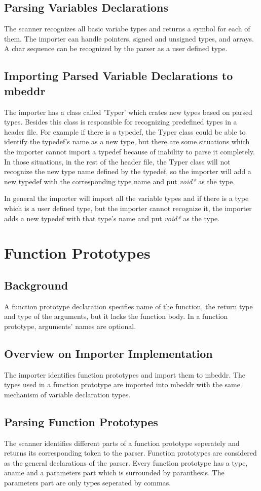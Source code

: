\documentclass[titlepage]{article}
\begin{document}
\subsection{Parsing Variables Declarations}
The scanner recognizes all basic variabe types and returns a symbol for each of them. The importer can handle pointers, signed and unsigned types, and arrays. A char sequence can be recognized by the parser as a user defined type.
\subsection{Importing Parsed Variable Declarations to mbeddr}
The importer has a class called 'Typer' which crates new types based on parsed types. Besides this class is responsible for recognizing predefined types in a header file. For example if there is a typedef, the Typer class could be able to identify the typedef's name as a new type, but there are some situations which the importer cannot import a typedef because of inability to parse it completely. In those situations, in the rest of the header file, the Typer class will not recognize the new type name defined by the typedef, so the importer will add a new typedef with the corresponding type name and put \emph{void*} as the type.

In general the importer will import all the variable types and if there is a type which is a user defined type, but the importer cannot recognize it, the importer adds a new typedef with that type's name and put \emph{void*} as the type. 

\section{Function Prototypes}
\subsection{Background}
A function prototype declaration specifies name of the function, the return type and type of the arguments, but it lacks the function body. In a function prototype, arguments' names are optional.
\subsection{Overview on Importer Implementation}
The importer identifies function prototypes and import them to mbeddr. The types used in a function prototype are imported into mbeddr with the same mechanism of variable declaration types.
\subsection{Parsing Function Prototypes}
The scanner identifies different parts of a function prototype seperately and returns its corresponding token to the parser. Function prototypes are considered as the general declarations of the parser. Every function prototype has a type, aname and a parameters part which is surrounded by paranthesis. The parameters part are only types seperated by commas.
\end{document}
